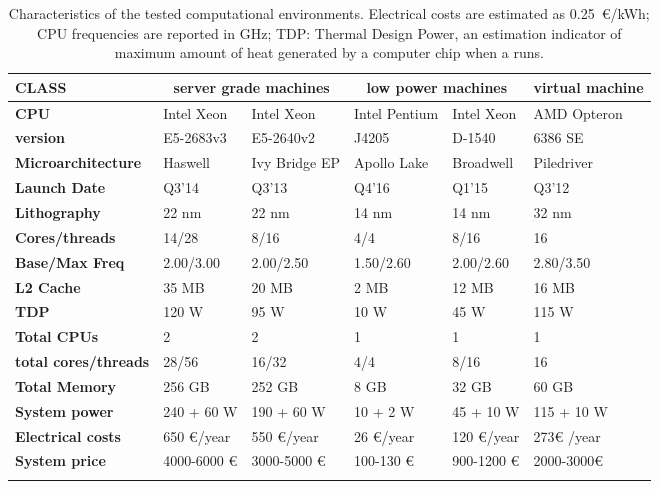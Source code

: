 \documentclass{standalone}
\begin{document}
\begin{table*}
\hspace{-.75cm}
\begin{tabular}{llllll}
\hline \rowcolor{darkgrayrow}
\textbf{CLASS} & \multicolumn{2}{c}{\textbf{server grade machines}} & \multicolumn{2}{c}{\textbf{low power machines}} & \textbf{virtual machine}\\
\hline
\textbf{CPU}      & Intel Xeon  & Intel Xeon  & Intel Pentium & Intel Xeon  & AMD Opteron \\
\textbf{version}    & E5-2683v3   & E5-2640v2   & J4205   & D-1540  & 6386 SE   \\
\textbf{Microarchitecture}  & Haswell   & Ivy Bridge EP & Apollo Lake   & Broadwell   & Piledriver  \\
\textbf{Launch Date}    & Q3'14   & Q3'13   & Q4'16   & Q1'15   & Q3'12   \\
\textbf{Lithography}    & 22 nm   & 22 nm   & 14 nm   & 14 nm   & 32 nm   \\
\textbf{Cores/threads}    & 14/28   & 8/16    & 4/4     & 8/16    & 16    \\
\textbf{Base/Max Freq}    & 2.00/3.00   & 2.00/2.50   & 1.50/2.60   & 2.00/2.60   & 2.80/3.50 \\
\textbf{L2 Cache}     & 35 MB   & 20 MB   & 2 MB    & 12 MB   & 16 MB   \\
\textbf{TDP}      & 120 W   & 95 W    & 10 W    & 45 W    & 115 W   \\
\textbf{Total CPUs}     & 2     & 2     & 1     & 1     & 1   \\
\textbf{total cores/threads}  & 28/56   & 16/32   & 4/4     & 8/16    & 16    \\
\textbf{Total Memory}     & 256 GB  & 252 GB  & 8 GB    & 32 GB   & 60 GB   \\
\textbf{System power}     & 240 + 60 W  & 190 + 60 W  & 10 + 2 W  & 45 + 10 W   & 115 + 10 W  \\
\textbf{Electrical costs}   & 650 €/year  & 550 €/year  & 26 €/year   & 120 €/year  & 273€ /year  \\
\textbf{System price}   & 4000-6000 €   & 3000-5000 €   & 100-130 €   & 900-1200 €  & 2000-3000€  \\
\hline\\
\end{tabular}
\caption{Characteristics of the tested computational environments.
Electrical costs are estimated as 0.25~€/kWh; CPU frequencies are reported in GHz; TDP: Thermal Design Power, an estimation indicator of maximum amount of heat generated by a computer chip when a  runs.}
\label{tab:node-characteristic}
\end{table*}
\end{document}
